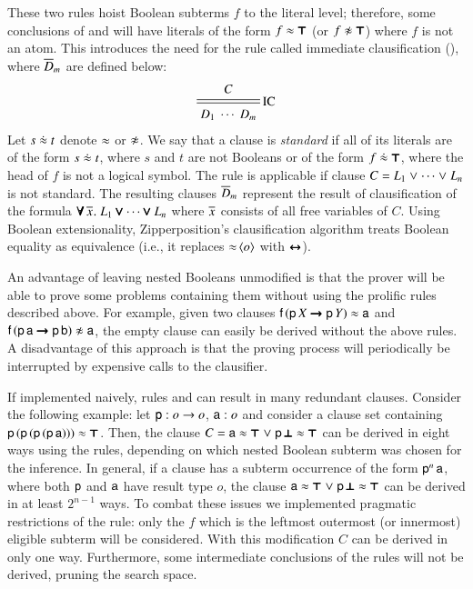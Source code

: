 \newcommand{\eqneq}{\mathrel{\dot{\eq}}}
These two rules hoist Boolean subterms $f$ to the literal level; therefore,
some conclusions of  and  will have literals of the form $f \approx \pmb{\top}$ (or
$f \noteq \itrue$) where $f$ is not an atom. This introduces the need for the rule
called immediate clausification (), where $\overline{D}_{m}$ are defined below:
%
$$ \namedsimp{IC}{C}{D_1 \; \cdots \; D_m} $$
%
Let $s \eqneq t$ denote $\approx$ or $\not\approx$.
We say that a clause is \emph{standard} if all of its literals are of the form $s \eqneq t$,
where $s$ and $t$ are not Booleans or of the form $f \eqneq \itrue$, where the head of $f$
is not a logical symbol. The rule 
is applicable if clause $C = L_1 \mathrel\lor
\cdots \mathrel\lor L_n$ is not standard.
The resulting clauses $\overline{D}_{m}$ represent
the result of clausification of the formula $\pmb{\forall}\,\overline{x}_{}. \; L_1 \pmb{\lor}
\cdots \pmb{\lor} L_n$ where $\overline{x}_{}$ consists of all free variables of $C$.
Using Boolean extensionality, Zipperposition's clausification
algorithm treats Boolean equality as equivalence (i.e., it replaces
$\mathop{\approx}{\langle o\rangle}$ with $\pmb{\leftrightarrow}$).

An advantage of leaving nested Booleans unmodified is that the prover will be able
to prove some problems containing them without using the prolific rules described
above. For example, given two clauses $\mathsf{f} \, (\mathsf{p} \, X
\pmb{\rightarrow} \mathsf{p} \, Y) \approx \mathsf{a}$ and $\cst{f} \, (\cst{p} \,
\cst{a} \iimplies \cst{p} \, \cst{b}) \noteq \cst{a}$, the empty clause can
easily be derived without the above rules. A disadvantage of this approach
is that the proving process will periodically be interrupted by expensive calls
to the clausifier.
\pagebreak[2]

If implemented naively, rules  and  can result
in many redundant clauses. Consider the following example: let $\mathsf{p} : o
\rightarrow o$, $\mathsf{a} : o$ and consider a clause set containing $\mathsf{p} \,
(\mathsf{p} \, (\mathsf{p} \, (\mathsf{p} \, \mathsf{a}))) \approx \pmb{\top}$. Then, the clause $C
= \mathsf{a} \approx \pmb{\top} \mathrel\lor \mathsf{p} \, \pmb{\bot} \approx \pmb{\top}$ can be derived in
eight ways using the rules, depending on which nested Boolean subterm was chosen
for the inference. In general, if a clause has a subterm occurrence of the form
$\mathsf{p}^n \, \mathsf{a}$, where both $\mathsf{p}$ and $\mathsf{a}$ have result type $o$,
the clause $\mathsf{a} \approx \pmb{\top} \mathrel\lor \mathsf{p} \, \pmb{\bot} \approx \pmb{\top}$ can be
derived in at least $2^{n-1}$ ways.
To combat these issues we
implemented pragmatic restrictions of the rule: only the $f$ which is
the leftmost outermost (or innermost) eligible subterm will be considered. With
this modification $C$ can be derived in only one way. Furthermore,
some intermediate conclusions of the rules will not be derived, pruning the search space.


